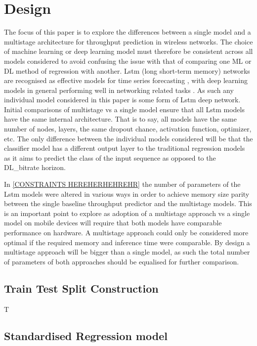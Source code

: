 \chapter{Design}
The focus of this paper is to explore the differences between a single model and a multistage architecture for throughput prediction in wireless networks. The choice of machine learning or deep learning model must therefore be consistent across all models considered to avoid confusing the issue with that of comparing one ML or DL method of regression with another. Lstm (long short-term memory) networks are recognised as effective models for time series forecasting \cite{8614252}, with deep learning models in general performing well in networking related tasks \cite{8666641}. As such any individual model considered in this paper is some form of Lstm deep network. Initial comparisons of multistage vs a single model ensure that all Lstm models have the same internal architecture. That is to say, all models have the same number of nodes, layers, the same dropout chance, activation function, optimizer, etc. The only difference between the individual models considered will be that the classifier model has a different output layer to the traditional regression models as it aims to predict the class of the input sequence as opposed to the DL\_bitrate horizon.

In \ref{CONSTRAINTS HEREHERHEHREHR} the number of parameters of the Lstm models were altered in various ways in order to achieve memory size parity between the single baseline throughput predictor and the multistage models. This is an important point to explore as adoption of a multistage approach vs a single model on mobile devices will require that both models have comparable performance on hardware. A multistage approach could only be considered more optimal if the required memory and inference time were comparable. By design a multistage approach will be bigger than a single model, as such the total number of parameters of both approaches should be equalised for further comparison.


\section{}


\section{Train Test Split Construction}
T


\section{Standardised Regression model}



